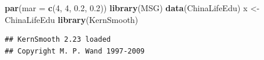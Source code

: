 \documentclass[
  b5paper,
  UTF8,twoside]{book}
\newenvironment{Shaded}{\begin{snugshade}}{\end{snugshade}}
\newcommand{\AttributeTok}[1]{\textcolor[rgb]{0.13,0.29,0.53}{#1}}
\newcommand{\DecValTok}[1]{\textcolor[rgb]{0.00,0.00,0.81}{#1}}
\newcommand{\FloatTok}[1]{\textcolor[rgb]{0.00,0.00,0.81}{#1}}
\newcommand{\FunctionTok}[1]{\textcolor[rgb]{0.13,0.29,0.53}{\textbf{#1}}}
\newcommand{\NormalTok}[1]{#1}
\newcommand{\OtherTok}[1]{\textcolor[rgb]{0.56,0.35,0.01}{#1}}
\begin{document}
\begin{Shaded}
\begin{Highlighting}[]
\FunctionTok{par}\NormalTok{(}\AttributeTok{mar =} \FunctionTok{c}\NormalTok{(}\DecValTok{4}\NormalTok{, }\DecValTok{4}\NormalTok{, }\FloatTok{0.2}\NormalTok{, }\FloatTok{0.2}\NormalTok{))}
\FunctionTok{library}\NormalTok{(MSG)}
\FunctionTok{data}\NormalTok{(ChinaLifeEdu)}
\NormalTok{x }\OtherTok{\textless{}{-}}\NormalTok{ ChinaLifeEdu}
\FunctionTok{library}\NormalTok{(KernSmooth)}
\end{Highlighting}
\end{Shaded}

\begin{verbatim}
## KernSmooth 2.23 loaded
## Copyright M. P. Wand 1997-2009
\end{verbatim}
\end{document}
